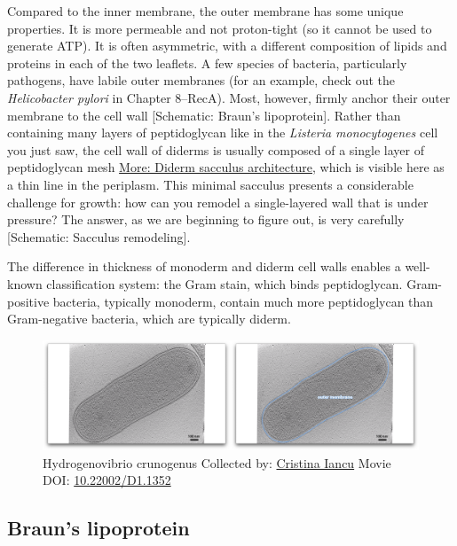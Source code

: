 \documentclass[]{tufte-book}
\begin{document}
Compared to the inner membrane, the outer membrane has some unique
properties. It is more permeable and not proton-tight (so it cannot be
used to generate ATP). It is often asymmetric, with a different
composition of lipids and proteins in each of the two leaflets. A few
species of bacteria, particularly pathogens, have labile outer membranes
(for an example, check out the \emph{Helicobacter pylori} in Chapter
8--RecA). Most, however, firmly anchor their outer membrane to the cell
wall {[}Schematic: Braun's lipoprotein{]}. Rather than containing many
layers of peptidoglycan like in the \emph{Listeria monocytogenes} cell
you just saw, the cell wall of diderms is usually composed of a single
layer of peptidoglycan mesh
\protect\hyperlink{Diderm_sacculus_architecture}{More: Diderm sacculus
architecture}, which is visible here as a thin line in the periplasm.
This minimal sacculus presents a considerable challenge for growth: how
can you remodel a single-layered wall that is under pressure? The
answer, as we are beginning to figure out, is very carefully
{[}Schematic: Sacculus remodeling{]}.

The difference in thickness of monoderm and diderm cell walls enables a
well-known classification system: the Gram stain, which binds
peptidoglycan. Gram-positive bacteria, typically monoderm, contain much
more peptidoglycan than Gram-negative bacteria, which are typically
diderm.





\begin{figure}
\includegraphics{movie_stills/2_3} \caption[Hydrogenovibrio crunogenus Collected by:
\protect\hyperlink{cristina_iancu}{Cristina Iancu} Movie DOI:
\href{https://doi.org/10.22002/D1.1352}{10.22002/D1.1352}]{Hydrogenovibrio crunogenus Collected by:
\protect\hyperlink{cristina_iancu}{Cristina Iancu} Movie DOI:
\href{https://doi.org/10.22002/D1.1352}{10.22002/D1.1352}}\label{fig:2-3}
\end{figure}

\subsection{Braun's lipoprotein}\label{Brauns_lipoprotein}
\end{document}

